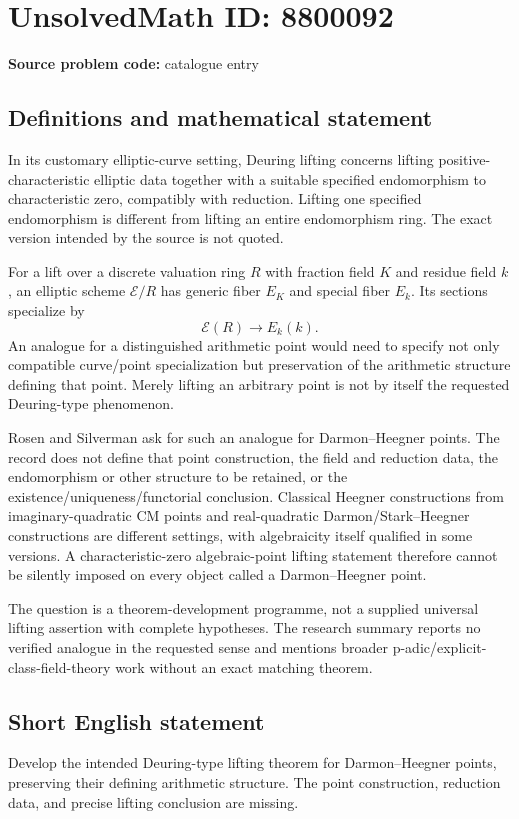 \documentclass[11pt]{article}
\begin{document}
\section*{UnsolvedMath ID: 8800092}
\textbf{Source problem code:} catalogue entry
\subsection{Definitions and mathematical statement}
In its customary elliptic-curve setting, Deuring lifting concerns lifting positive-characteristic elliptic data together with a suitable specified endomorphism to characteristic zero, compatibly with reduction. Lifting one specified endomorphism is different from lifting an entire endomorphism ring. The exact version intended by the source is not quoted.

For a lift over a discrete valuation ring \(R\) with fraction field \(K\) and residue field \(k\), an elliptic scheme \(\mathcal E/R\) has generic fiber \(E_K\) and special fiber \(E_k\). Its sections specialize by
\[
\mathcal E(R)\longrightarrow E_k(k).
\]
An analogue for a distinguished arithmetic point would need to specify not only compatible curve/point specialization but preservation of the arithmetic structure defining that point. Merely lifting an arbitrary point is not by itself the requested Deuring-type phenomenon.

Rosen and Silverman ask for such an analogue for Darmon--Heegner points. The record does not define that point construction, the field and reduction data, the endomorphism or other structure to be retained, or the existence/uniqueness/functorial conclusion. Classical Heegner constructions from imaginary-quadratic CM points and real-quadratic Darmon/Stark--Heegner constructions are different settings, with algebraicity itself qualified in some versions. A characteristic-zero algebraic-point lifting statement therefore cannot be silently imposed on every object called a Darmon--Heegner point.

The question is a theorem-development programme, not a supplied universal lifting assertion with complete hypotheses. The research summary reports no verified analogue in the requested sense and mentions broader p-adic/explicit-class-field-theory work without an exact matching theorem.
\subsection{Short English statement}
Develop the intended Deuring-type lifting theorem for Darmon--Heegner points, preserving their defining arithmetic structure. The point construction, reduction data, and precise lifting conclusion are missing.
\end{document}
